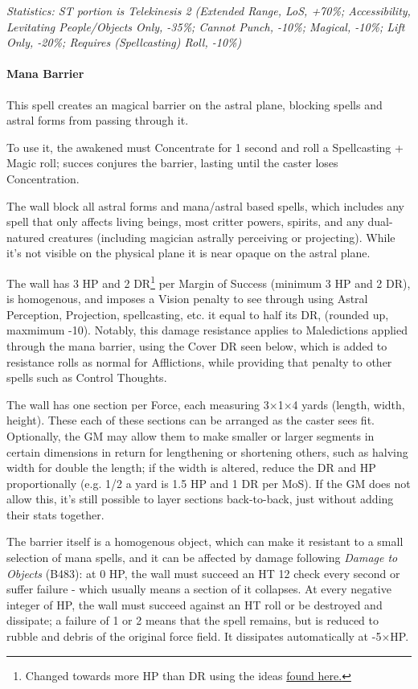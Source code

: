 \begin{multicols}{3}
	\textcolor{OliveGreen}{\textit{Statistics: ST portion is Telekinesis 2 (Extended Range, LoS, +70\%; Accessibility, Levitating People/Objects Only, -35\%; Cannot Punch, -10\%; Magical, -10\%; Lift Only, -20\%; Requires (Spellcasting) Roll, -10\%) }}
	
	\paragraph{Mana Barrier}
	
	This spell creates an magical barrier on the astral plane, blocking spells and astral forms from passing through it.
	
	To use it, the awakened must Concentrate for 1 second and roll a Spellcasting + Magic roll; succes conjures the barrier, lasting until the caster loses Concentration.
	
	The wall block all astral forms and mana/astral based spells, which includes any spell that only affects living beings,  most critter powers, spirits, and any dual-natured creatures (including magician astrally perceiving or projecting). While it's not visible on the physical plane it is near opaque on the astral plane.
	
	The wall has 3 HP and 2 DR\footnote{Changed towards more HP than DR using the ideas \textcolor{Blue}{\href{http://forums.sjgames.com/showpost.php?p=2050064&postcount=3}{found here.}}} per Margin of Success (minimum 3 HP and 2 DR), is homogenous, and imposes a Vision penalty to see through using Astral Perception, Projection, spellcasting, etc. it equal to half its DR, (rounded up, maxmimum -10). Notably, this damage resistance applies to Maledictions applied through the mana barrier, using the Cover DR seen below, which is added to resistance rolls as normal for Afflictions, while providing that penalty to other spells such as Control Thoughts.
	
	The wall has one section per Force, each measuring 3$\times$1$\times$4 yards (length, width, height). These each of these sections can be arranged as the caster sees fit. Optionally, the GM may allow them to make smaller or larger segments in certain dimensions in return for lengthening or shortening others, such as halving width for double the length; if the width is altered, reduce the DR and HP proportionally (e.g. 1/2 a yard is 1.5 HP and 1 DR per MoS). If the GM does not allow this, it's still possible to layer sections back-to-back, just without adding their stats together.
	
	The barrier itself is a homogenous object, which can make it resistant to a small selection of mana spells, and it can be affected by damage following \textit{Damage to Objects} (B483): at 0 HP, the wall must succeed an HT 12 check every second or suffer failure - which usually means a section of it collapses. At every negative integer of HP, the wall must succeed against an HT roll or be destroyed and dissipate; a failure of 1 or 2 means that the spell remains, but is reduced to rubble and debris of the original force field. It dissipates automatically at -5$\times$HP.
	

\end{multicols}

